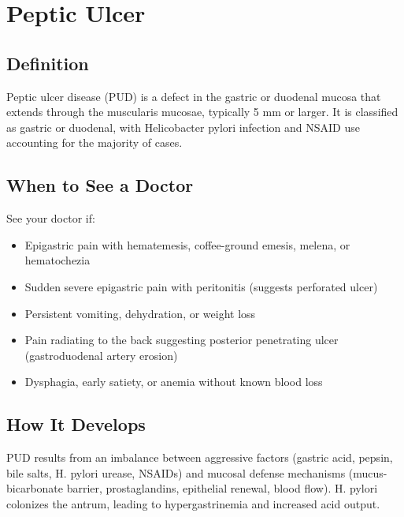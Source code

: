 \chapter{Peptic Ulcer}

\section*{Definition}
Peptic ulcer disease (PUD) is a defect in the gastric or duodenal mucosa that extends through the muscularis mucosae, typically 5 mm or larger. It is classified as gastric or duodenal, with Helicobacter pylori infection and NSAID use accounting for the majority of cases.

\section*{When to See a Doctor}
See your doctor if:
\begin{itemize}
  \item Epigastric pain with hematemesis, coffee-ground emesis, melena, or hematochezia
  \item Sudden severe epigastric pain with peritonitis (suggests perforated ulcer)
  \item Persistent vomiting, dehydration, or weight loss
  \item Pain radiating to the back suggesting posterior penetrating ulcer (gastroduodenal artery erosion)
  \item Dysphagia, early satiety, or anemia without known blood loss
\end{itemize}

\section*{How It Develops}
PUD results from an imbalance between aggressive factors (gastric acid, pepsin, bile salts, H. pylori urease, NSAIDs) and mucosal defense mechanisms (mucus-bicarbonate barrier, prostaglandins, epithelial renewal, blood flow). H. pylori colonizes the antrum, leading to hypergastrinemia and increased acid output.

